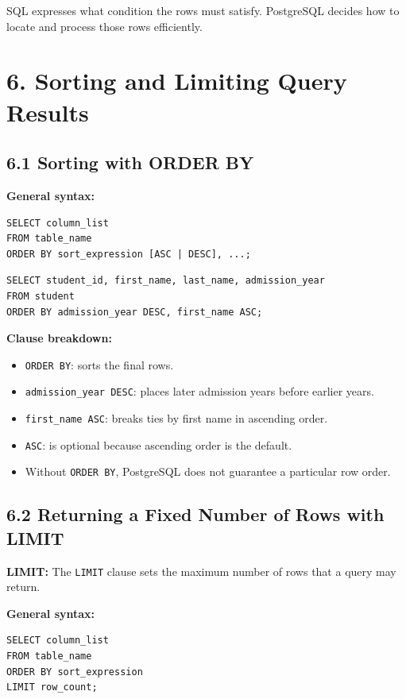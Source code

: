 \documentclass[12pt,a4paper]{article}
\newcommand{\defbox}[2]{%
  \vspace{0.2cm}
  \noindent\colorbox{boxgray}{\parbox{\dimexpr\linewidth-2\fboxsep}{%
    \textbf{#1:} #2
  }}
  \vspace{0.2cm}
}
\begin{document}
\noindent SQL expresses what condition the rows must satisfy. PostgreSQL decides how to locate and
process those rows efficiently.

\section*{6. Sorting and Limiting Query Results}

\subsection*{6.1 Sorting with ORDER BY}
\noindent\textbf{General syntax:}
\begin{verbatim}
SELECT column_list
FROM table_name
ORDER BY sort_expression [ASC | DESC], ...;
\end{verbatim}

\begin{verbatim}
SELECT student_id, first_name, last_name, admission_year
FROM student
ORDER BY admission_year DESC, first_name ASC;
\end{verbatim}

\noindent\textbf{Clause breakdown:}
\begin{itemize}
    \item \texttt{ORDER BY}: sorts the final rows.
    \item \texttt{admission\_year DESC}: places later admission years before earlier years.
    \item \texttt{first\_name ASC}: breaks ties by first name in ascending order.
    \item \texttt{ASC}: is optional because ascending order is the default.
    \item Without \texttt{ORDER BY}, PostgreSQL does not guarantee a particular row order.
\end{itemize}

\subsection*{6.2 Returning a Fixed Number of Rows with LIMIT}
\defbox{LIMIT}{The \texttt{LIMIT} clause sets the maximum number of rows that a query may return.}

\noindent\textbf{General syntax:}
\begin{verbatim}
SELECT column_list
FROM table_name
ORDER BY sort_expression
LIMIT row_count;
\end{verbatim}
\end{document}
